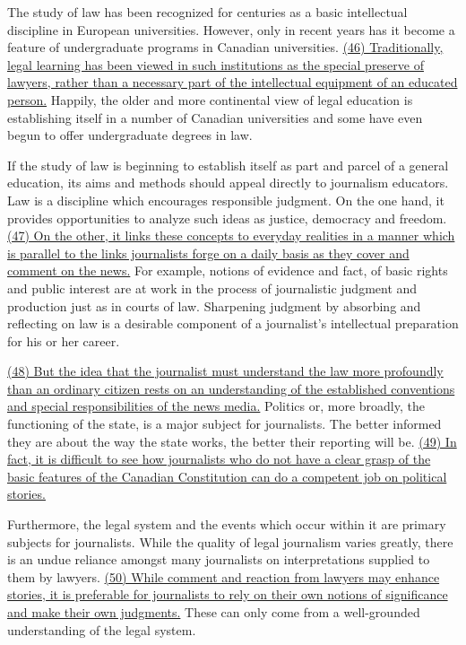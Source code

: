
\qquad The study of law has been recognized for centuries as a basic intellectual discipline in European universities. However, only in recent years has it become a feature of undergraduate programs in Canadian universities. \ul{(46) Traditionally, legal learning has been viewed in such institutions as the special preserve of lawyers, rather than a necessary part of the intellectual equipment of an educated person.} Happily, the older and more continental view of legal education is establishing itself in a number of Canadian universities and some have even begun to offer undergraduate degrees in law.

\qquad If the study of law is beginning to establish itself as part and parcel of a general education, its aims and methods should appeal directly to journalism educators. Law is a discipline which encourages responsible judgment. On the one hand, it provides opportunities to analyze such ideas as justice, democracy and freedom. \ul{(47) On the other, it links these concepts to everyday realities in a manner which is parallel to the links journalists forge on a daily basis as they cover and comment on the news.} For example, notions of evidence and fact, of basic rights and public interest are at work in the process of journalistic judgment and production just as in courts of law. Sharpening judgment by absorbing and reflecting on law is a desirable component of a journalist's intellectual preparation for his or her career.

\qquad \ul{(48) But the idea that the journalist must understand the law more profoundly than an ordinary citizen rests on an understanding of the established conventions and special responsibilities of the news media.} Politics or, more broadly, the functioning of the state, is a major subject for journalists. The better informed they are about the way the state works, the better their reporting will be. \ul{(49) In fact, it is difficult to see how journalists who do not have a clear grasp of the basic features of the Canadian Constitution can do a competent job on political stories.}

\qquad Furthermore, the legal system and the events which occur within it are primary subjects for journalists. While the quality of legal journalism varies greatly, there is an undue reliance amongst many journalists on interpretations supplied to them by lawyers. \ul{(50) While comment and reaction from lawyers may enhance stories, it is preferable for journalists to rely on their own notions of significance and make their own judgments.} These can only come from a well-grounded understanding of the legal system.